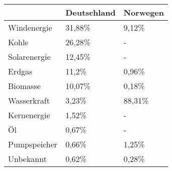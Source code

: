 \begin{tabular}{|p{5cm}|p{5cm}|p{5cm}|}
    \hline
    & Deutschland & Norwegen \\
    \hline
    \hline
    Windenergie & 31,88\% & 9,12\% \\
    \hline
    Kohle & 26,28\% & -\\
    \hline
    Solarenergie & 12,45\% & -\\
    \hline
    Erdgas & 11,2\% & 0,96\% \\
    \hline
    Biomasse & 10,07\% & 0,18\% \\
    \hline
    Wasserkraft & 3,23\% & 88,31\% \\
    \hline
    Kernenergie & 1,52\% & -\\
    \hline
    Öl & 0,67\% & -\\
    \hline
    Pumpspeicher & 0,66\% & 1,25\% \\
    \hline
    Unbekannt & 0,62\% & 0,28\% \\
    \hline
\end{tabular}

